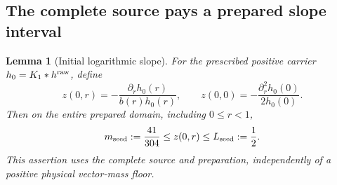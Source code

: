 \documentclass[11pt]{article}
\numberwithin{equation}{section}
\newtheorem{lemma}[theorem]{Lemma}
\begin{document}
\subsection{The complete source pays a prepared slope interval}

\begin{lemma}[Initial logarithmic slope]\label{r15:seed}
For the prescribed positive carrier $h_0=K_1*h^{\rm raw}$, define
\[
 z(0,r)=-\frac{\partial_rh_0(r)}{b(r)h_0(r)},\qquad
 z(0,0)=-\frac{\partial_r^2h_0(0)}{2h_0(0)}.
\]
Then on the entire prepared domain, including $0\le r<1$,
\begin{equation}\label{r15:seedband}
 m_{\rm seed}:=\frac{41}{304}\le z(0,r)\le
 L_{\rm seed}:=\frac12.
\end{equation}
This assertion uses the complete source and preparation, independently
of a positive physical vector-mass floor.
\end{lemma}
\end{document}
